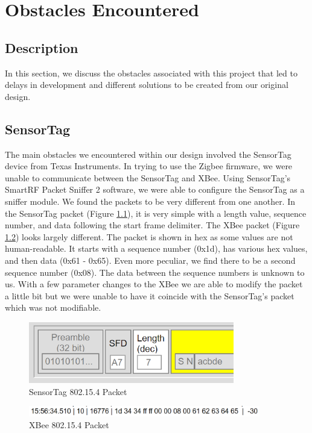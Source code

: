 \chapter{Obstacles Encountered}

\section{Description}
In this section, we discuss the obstacles associated with this project that led to delays in development and different solutions to be created from our original design.

\section{SensorTag}
The main obstacles we encountered within our design involved the SensorTag device from Texas Instruments. In trying to use the Zigbee firmware, we were unable to communicate between the SensorTag and XBee. Using SensorTag’s SmartRF Packet Sniffer 2 software, we were able to configure the SensorTag as a sniffer module. We found the packets to be very different from one another. In the SensorTag packet (Figure \ref{fig:sensortag}), it is very simple with a length value, sequence number, and data following the start frame delimiter. The XBee packet (Figure \ref{fig:xbee}) looks largely different. The packet is shown in hex as some values are not human-readable. It starts with a sequence number (0x1d), has various hex values, and then data (0x61 - 0x65). Even more peculiar, we find there to be a second sequence number (0x08). The data between the sequence numbers is unknown to us. With a few parameter changes to the XBee we are able to modify the packet a little bit but we were unable to have it coincide with the SensorTag’s packet which was not modifiable.

\begin{figure}[h]
  \includegraphics[width=0.8\textwidth]{SensorTag-packet.png}
  \centering
  \caption{SensorTag 802.15.4 Packet}
  \label{fig:sensortag}
\end{figure}

\begin{figure}[h]
  \includegraphics[width=0.9\textwidth]{XBee-packet.PNG}
  \centering
  \caption{XBee 802.15.4 Packet}
  \label{fig:xbee}
\end{figure}

